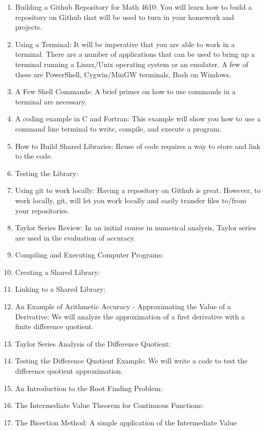 \documentclass[10pt,fleqn]{article}
\begin{document}
\begin{enumerate}
\begin{verbatim}
        \end{verbatim}
  \item Building a Github Repository for Math 4610: You will learn how to build
        a repository on Github that will be used to turn in your homework and
        projects.
  \item Using a Terminal: It will be imperative that you are able to work in a
        terminal. There are a number of applications that can be used to bring
        up a terminal running a Linux/Unix operating system or an emulater. A
        few of these are PowerShell, Cygwin/MinGW terminals, Bash on Windows.
  \item A Few Shell Commands: A brief primer on how to use commands in a
        terminal are necessary.
  \item A coding example in C and Fortran: This example will show you how to use
        a command line terminal to write, compile, and execute a program.
  \item How to Build Shared Libraries: Reuse of code requires a way to store and
        link to the code.
  \item Testing the Library: 
  \item Using git to work locally: Having a repository on Github is great.
        However, to work locally, git, will let you work locally and easily
        transfer files to/from your repositories.
  \item Taylor Series Review: In an initial course in numerical analysis, Taylor
        series are used in the evaluation of accuracy.
  \item Compiling and Executing Computer Programs:
  \item Creating a Shared Library:
  \item Linking to a Shared Library:
  \item An Example of Arithmetic Accuracy - Approximating the Value of a
        Derivative: We will analyze the approximation of a first derivative with
        a finite difference quotient.
  \item Taylor Series Analysis of the Difference Quotient:
  \item Testing the Difference Quotient Example: We will write a code to test
        the difference quotient approximation.
  \item An Introduction to the Root Finding Problem:
  \item The Intermediate Value Theorem for Continuous Functions:
  \item The Bisection Method: A simple application of the Intermediate Value

\end{enumerate}
\end{document}
